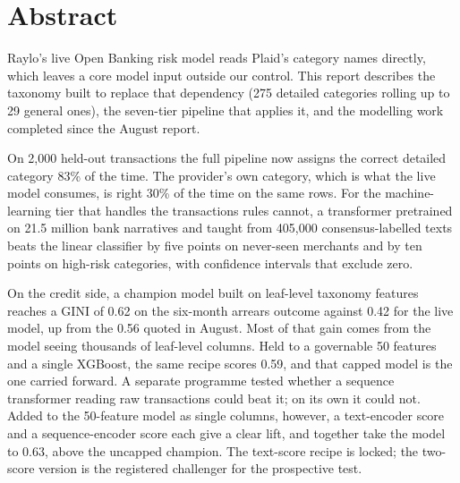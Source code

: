 \section*{Abstract}
Raylo's live Open Banking risk model reads Plaid's category names directly, which leaves a core model input outside our control. This report describes the taxonomy built to replace that dependency (275 detailed categories rolling up to 29 general ones), the seven-tier pipeline that applies it, and the modelling work completed since the August report.

On 2,000 held-out transactions the full pipeline now assigns the correct detailed category 83\% of the time. The provider's own category, which is what the live model consumes, is right 30\% of the time on the same rows. For the machine-learning tier that handles the transactions rules cannot, a transformer pretrained on 21.5 million bank narratives and taught from 405,000 consensus-labelled texts beats the linear classifier by five points on never-seen merchants and by ten points on high-risk categories, with confidence intervals that exclude zero.

On the credit side, a champion model built on leaf-level taxonomy features reaches a GINI of 0.62 on the six-month arrears outcome against 0.42 for the live model, up from the 0.56 quoted in August. Most of that gain comes from the model seeing thousands of leaf-level columns. Held to a governable 50 features and a single XGBoost, the same recipe scores 0.59, and that capped model is the one carried forward. A separate programme tested whether a sequence transformer reading raw transactions could beat it; on its own it could not. Added to the 50-feature model as single columns, however, a text-encoder score and a sequence-encoder score each give a clear lift, and together take the model to 0.63, above the uncapped champion. The text-score recipe is locked; the two-score version is the registered challenger for the prospective test.

